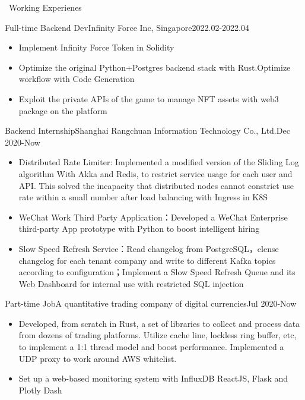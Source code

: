 \documentclass{resume}
\begin{document}
\begin{rSection}{\faUsers~Working Experienes}
\begin{rExperience}{Full-time Backend Dev}{Infinity Force Inc, Singapore}{2022.02-2022.04}
\begin{itemize}
            \itemsep -0.5em \vspace{-0.5em}
            \item Implement Infinity Force Token in Solidity
            \item Optimize the original Python+Postgres backend stack with Rust.Optimize workflow with Code Generation
            \item Exploit the private APIs of the game to manage NFT assets with web3 package on the platform
        \end{itemize}
    \end{rExperience}
    \begin{rExperience}{Backend Internship}{Shanghai Rangchuan Information Technology Co., Ltd.}{Dec 2020-Now}
        \begin{itemize}
            \itemsep -0.5em \vspace{-0.5em}
            \item Distributed Rate Limiter: Implemented  a modified version of the Sliding Log algorithm With Akka and Redis, to restrict service usage for each user and API. This solved the incapacity that distributed nodes cannot constrict use rate within a small number after load balancing with Ingress in K8S
            \item WeChat Work Third Party Application：Developed a WeChat Enterprise third-party App prototype with Python to boost intelligent hiring
            \item Slow Speed Refresh Service：Read changelog from PostgreSQL，clense changelog for each tenant company and write to different Kafka topics according to configuration；Implement a Slow Speed Refresh Queue and its Web Dashboard for internal use with restricted SQL injection       
        \end{itemize}
    \end{rExperience}
    \begin{rExperience}{Part-time Job}{A quantitative trading company of digital currencies}{Jul 2020-Now}
        \begin{itemize}
            \itemsep -0.5em \vspace{-0.5em}
            \item Developed, from scratch in Rust, a set of libraries to collect and process data from dozens of trading platforms. Utilize cache line, lockless ring buffer, etc, to implement a 1:1 thread model and boost performance. Implemented a UDP proxy to work around AWS whitelist.
            \item Set up a web-based monitoring system with InfluxDB ReactJS, Flask and Plotly Dash

\end{itemize}
\end{rExperience}
\end{rSection}
\end{document}
